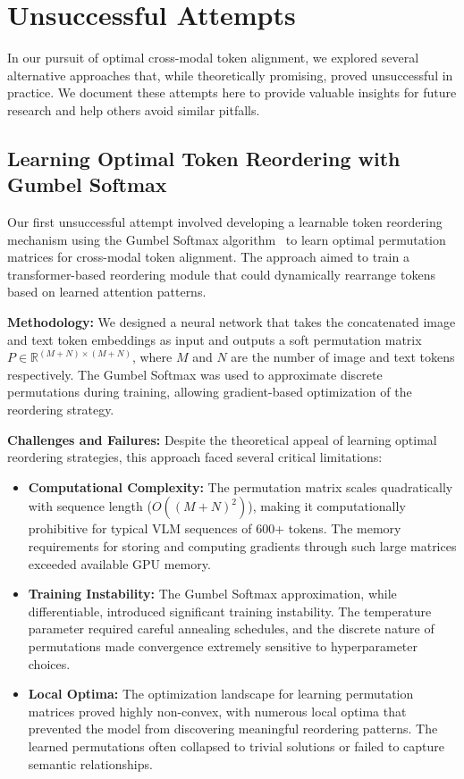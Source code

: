 \documentclass[11pt]{article}
\begin{document}
\section{Unsuccessful Attempts}
\label{app:unsuccessful_attempts}

In our pursuit of optimal cross-modal token alignment, we explored several alternative approaches that, while theoretically promising, proved unsuccessful in practice. We document these attempts here to provide valuable insights for future research and help others avoid similar pitfalls.

\subsection{Learning Optimal Token Reordering with Gumbel Softmax}

Our first unsuccessful attempt involved developing a learnable token reordering mechanism using the Gumbel Softmax algorithm~\citep{jang2016categorical, mena2018learning} to learn optimal permutation matrices for cross-modal token alignment. The approach aimed to train a transformer-based reordering module that could dynamically rearrange tokens based on learned attention patterns.

\textbf{Methodology:} We designed a neural network that takes the concatenated image and text token embeddings as input and outputs a soft permutation matrix $P \in \mathbb{R}^{(M+N) \times (M+N)}$, where $M$ and $N$ are the number of image and text tokens respectively. The Gumbel Softmax was used to approximate discrete permutations during training, allowing gradient-based optimization of the reordering strategy.

\textbf{Challenges and Failures:} Despite the theoretical appeal of learning optimal reordering strategies, this approach faced several critical limitations:

\begin{itemize}
\item \textbf{Computational Complexity:} The permutation matrix scales quadratically with sequence length ($O((M+N)^2)$), making it computationally prohibitive for typical VLM sequences of 600+ tokens. The memory requirements for storing and computing gradients through such large matrices exceeded available GPU memory.

\item \textbf{Training Instability:} The Gumbel Softmax approximation, while differentiable, introduced significant training instability. The temperature parameter required careful annealing schedules, and the discrete nature of permutations made convergence extremely sensitive to hyperparameter choices.

\item \textbf{Local Optima:} The optimization landscape for learning permutation matrices proved highly non-convex, with numerous local optima that prevented the model from discovering meaningful reordering patterns. The learned permutations often collapsed to trivial solutions or failed to capture semantic relationships.

\end{itemize}
\end{document}
